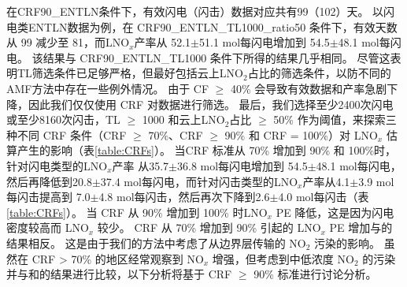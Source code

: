 在CRF90\_ENTLN条件下，有效闪电（闪击）数据对应共有99（102）天。
以闪电类ENTLN数据为例，在 CRF90\_ENTLN\_TL1000\_ratio50 条件下，有效天数从 99 减少至 81，而LNO$_x$产率从 52.1$\pm$51.1 mol每闪电增加到 54.5$\pm$48.1 mol每闪电。
该结果与 CRF90\_ENTLN\_TL1000 条件下所得的结果几乎相同。
尽管这表明TL筛选条件已足够严格，但最好包括云上LNO$_2$占比的筛选条件，以防不同的AMF方法中存在一些例外情况。
由于 CF $\geq$ 40\% 会导致有效数据和产率急剧下降，因此我们仅仅使用 CRF 对数据进行筛选。
最后，我们选择至少2400次闪电或至少8160次闪击，TL $\geq$ 1000 和云上LNO$_2$占比 $\geq$ 50\% 作为阈值，来探索三种不同 CRF 条件（CRF $\geq$ 70\%、CRF $\geq$ 90\% 和 CRF = 100\%）对 LNO$_x$ 估算产生的影响（表\ref{table:CRFs}）。
当CRF 标准从 70\% 增加到 90\% 和 100\%时，针对闪电类型的LNO$_x$产率 从35.7$\pm$36.8 mol每闪电增加到 54.5$\pm$48.1 mol每闪电，然后再降低到20.8$\pm$37.4 mol每闪电，而针对闪击类型的LNO$_x$产率从4.1$\pm$3.9 mol每闪击提高到 7.0$\pm$4.8 mol每闪击，然后再次下降到2.6$\pm$4.0 mol每闪击（表\ref{table:CRFs}）。
当 CRF 从 90\% 增加到 100\% 时LNO$_x$ PE 降低，这是因为闪电密度较高而 LNO$_x$ 较少。
CRF 从 70\% 增加到 90\% 引起的 LNO$_x$ PE 增加与\citet{Pickering.2016}的结果相反。
这是由于我们的方法中考虑了从边界层传输的 NO$_2$ 污染的影响。
虽然在 CRF > 70\% 的地区经常观察到 NO$_x$ 增强\citet{Pickering.2016}，但考虑到中低浓度 NO$_2$ 的污染并与\citet{Pickering.2016}和\citet{Lapierre.2020}的结果进行比较，以下分析将基于 CRF $\geq$ 90\% 标准进行讨论分析。

